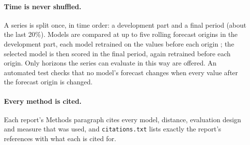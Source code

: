 \documentclass[11pt,a4paper]{article}
\begin{document}
\paragraph{Time is never shuffled.} A series is split once, in time order: a development part and a final period (about the last 20\%). Models are compared at up to five rolling forecast origins in the development part, each model retrained on the values before each origin \citep{tashman2000}; the selected model is then scored in the final period, again retrained before each origin. Only horizons the series can evaluate in this way are offered. An automated test checks that no model's forecast changes when every value after the forecast origin is changed.

\paragraph{Every method is cited.} Each report's Methods paragraph cites every model, distance, evaluation design and measure that was used, and \texttt{citations.txt} lists exactly the report's references with what each is cited for.
\end{document}

